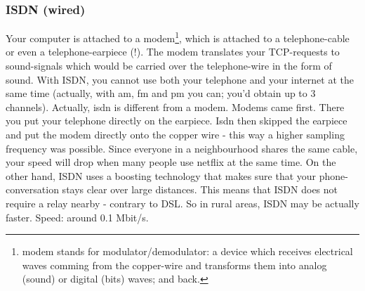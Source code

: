 \subsubsection{ISDN (wired)}
Your computer is attached to a modem\footnote{modem stands for modulator/demodulator: a device which receives electrical waves comming from the copper-wire and transforms them into analog (sound) or digital (bits) waves; and back.}, which is attached to a telephone-cable or even a telephone-earpiece (!). The modem translates your TCP-requests to sound-signals which would be carried over the telephone-wire in the form of sound. With ISDN, you cannot use both your telephone and your internet at the same time (actually, with am, fm and pm you can; you'd obtain up to 3 channels).  
Actually, isdn is different from a modem. Modems came first. There you put your telephone directly on the earpiece. Isdn then skipped the earpiece and put the modem directly onto the copper wire - this way a higher sampling frequency was possible. 
Since everyone in a neighbourhood shares the same cable, your speed will drop when many people use netflix at the same time. 
On the other hand, ISDN uses a boosting technology that makes sure that your phone-conversation stays clear over large distances. This means that ISDN does not require a relay nearby - contrary to DSL. So in rural areas, ISDN may be actually faster. 
Speed: around 0.1 Mbit/s.


